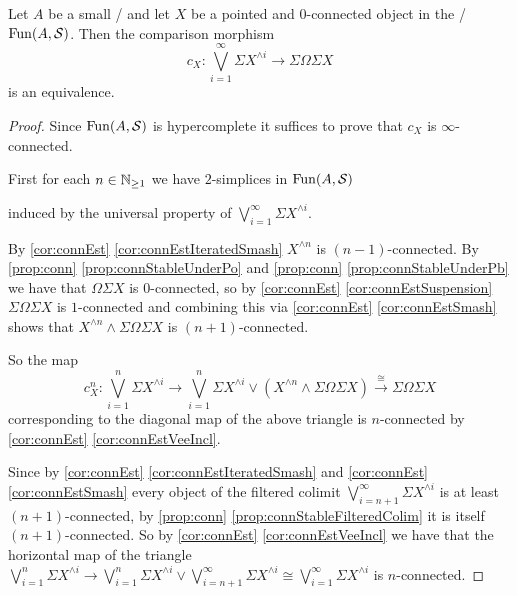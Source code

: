 \begin{prop}\label{prop:jamesSplittingPresheaf} %
    Let $A$ be a small \inftycat/ and let $X$ be a pointed and $0$-connected object in the \inftytop/ $\operatorname{Fun}(A,\mathcal{S})$.
    Then the comparison morphism 
    \begin{equation*}
        c_X\colon\bigvee\limits_{i=1}^{\infty}\Sigma X^{\wedge i}\to\Sigma\Omega\Sigma X
    \end{equation*}
    is an equivalence. 
    \begin{proof}
        Since $\operatorname{Fun}(A,\mathcal{S})$ is hypercomplete it suffices to prove that $c_X$ is $\infty$-connected.

        First for each $n\in\mathbb{N}_{\geq 1}$ we have $2$-simplices in $\operatorname{Fun}(A,\mathcal{S})$
        \begin{center}
        \end{center}
        induced by the universal property of $\bigvee\limits_{i=1}^{\infty}\Sigma X^{\wedge i}$.

        By \cref{cor:connEst} \ref{cor:connEstIteratedSmash} $X^{\wedge n}$ is $(n-1)$-connected.
        By \cref{prop:conn} \ref{prop:connStableUnderPo} and \cref{prop:conn} \ref{prop:connStableUnderPb} we have that $\Omega\Sigma X$ is $0$-connected, so by \cref{cor:connEst} \ref{cor:connEstSuspension} $\Sigma\Omega\Sigma X$ is $1$-connected and combining this via \cref{cor:connEst} \ref{cor:connEstSmash} shows that $X^{\wedge n}\wedge\Sigma\Omega\Sigma X$ is $(n+1)$-connected.

        So the map 
        \begin{equation*}
            c_X^n\colon\bigvee\limits_{i=1}^n\Sigma X^{\wedge i}\to\bigvee\limits_{i=1}^n\Sigma X^{\wedge i}\vee\left(X^{\wedge n}\wedge\Sigma\Omega\Sigma X\right)\xrightarrow{\cong}\Sigma\Omega\Sigma X
        \end{equation*}
        corresponding to the diagonal map of the above triangle is $n$-connected by \cref{cor:connEst} \ref{cor:connEstVeeIncl}.

        Since by \cref{cor:connEst} \ref{cor:connEstIteratedSmash} and \cref{cor:connEst} \ref{cor:connEstSmash} every object of the filtered colimit $\bigvee\limits_{i=n+1}^{\infty}\Sigma X^{\wedge i}$ is at least $(n+1)$-connected, by \cref{prop:conn} \ref{prop:connStableFilteredColim} it is itself $(n+1)$-connected.
        So by \cref{cor:connEst} \ref{cor:connEstVeeIncl} we have that the horizontal map of the triangle $\bigvee\limits_{i=1}^n\Sigma X^{\wedge i}\to\bigvee\limits_{i=1}^n\Sigma X^{\wedge i}\vee\bigvee\limits_{i=n+1}^{\infty}\Sigma X^{\wedge i}\cong\bigvee\limits_{i=1}^{\infty}\Sigma X^{\wedge i}$ is $n$-connected.


\end{proof}
\end{prop}
